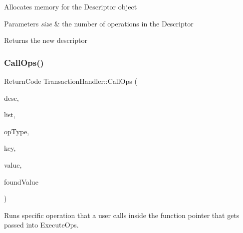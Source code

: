 Allocates memory for the Descriptor object


\begin{DoxyParams}{Parameters}
{\em size} & the number of operations in the Descriptor \\
\hline
\end{DoxyParams}
\begin{DoxyReturn}{Returns}
the new descriptor 
\end{DoxyReturn}
\mbox{\label{classTransactionHandler_a0155e14e3f8f1a20f5962999c1bf91af}} 
\subsubsection{\texorpdfstring{Call\+Ops()}{CallOps()}}
{\footnotesize\ttfamily Return\+Code Transaction\+Handler\+::\+Call\+Ops (\begin{DoxyParamCaption}\item[{\hyperlink{structDesc}{Desc} $\ast$}]{desc,  }\item[{\hyperlink{classTransactionalContainer}{Transactional\+Container} $\ast$}]{list,  }\item[{Op\+Type}]{op\+Type,  }\item[{setkey\+\_\+t}]{key,  }\item[{int}]{value,  }\item[{int \&}]{found\+Value }\end{DoxyParamCaption})\hspace{0.3cm}{\ttfamily [static]}}

Runs specific operation that a user calls inside the function pointer that gets passed into Execute\+Ops.


